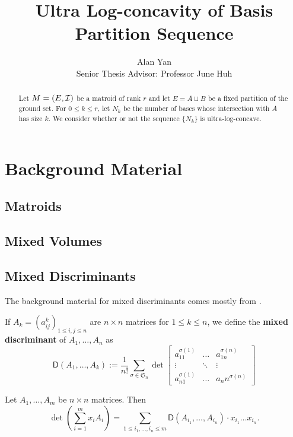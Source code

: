 \documentclass[12pt]{article}
\title{Ultra Log-concavity of Basis Partition Sequence}
\author{Alan Yan \\ Senior Thesis Advisor: Professor June Huh}
\begin{document}
\maketitle

\begin{abstract}
	Let $M = (E, \mathcal{I})$ be a matroid of rank $r$ and let $E = A \sqcup B$ be a fixed partition of the ground set. For $0 \leq k \leq r$, let $N_k$ be the number of bases whose intersection with $A$ has size $k$. We consider whether or not the sequence $\{N_k\}$ is ultra-log-concave. 
\end{abstract}
\tableofcontents

\newpage 

\section{Background Material}

\subsection{Matroids}

\subsection{Mixed Volumes}

\subsection{Mixed Discriminants}

The background material for mixed discriminants comes mostly from \cite{bapat_raghavan_1997}.  
\begin{defn}
	If $A_k = (a^k_{ij})_{1 \leq i, j \leq n}$ are $n \times n$ matrices for $1 \leq k \leq n$, we define the \textbf{mixed discriminant} of $A_1, \ldots, A_n$ as
	\[
		\mathsf{D}(A_1, \ldots, A_k) := \frac{1}{n!} \sum_{\sigma \in \mathfrak{S}_n}\det \begin{bmatrix}
			a^{\sigma(1)}_{11} & \ldots & a_{1n}^{\sigma(n)} \\
			\vdots & \ddots & \vdots \\
			a_{n1}^{\sigma(1)} & \ldots & a_nn^{\sigma(n)}
		\end{bmatrix}
	\]
\end{defn}

\begin{thm}
	Let $A_1, \ldots, A_m$ be $n \times n$ matrices. Then 
	\[
		\det \left ( \sum_{i = 1}^m x_i A_i \right ) = \sum_{1 \leq i_1, \ldots, i_n \leq m} \mathsf{D}(A_{i_1}, \ldots, A_{i_n}) \cdot x_{i_1} \ldots x_{i_n}.
	\]
\end{thm}
\end{document}
